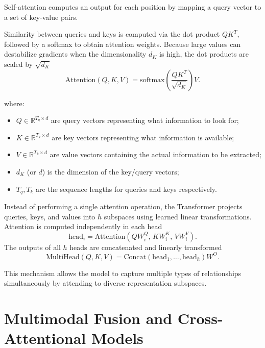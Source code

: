 Self-attention computes an output for each position by mapping a query vector to a set of key-value pairs.


Similarity between queries and keys is computed via the dot product $QK^{T}$, followed by a softmax to obtain attention weights. Because large values can destabilize gradients when the dimensionality $d_{K}$ is high, the dot products are scaled by $\sqrt{d_{K}}$
\begin{equation}
\label{eq:attention}
\mathrm{Attention}(Q, K, V)
= \mathrm{softmax}\left( \frac{QK^{T}}{\sqrt{d_{K}}} \right) V.
\end{equation}

where:
\begin{itemize}
    \item $Q \in \mathbb{R}^{T_q \times d}$ are query vectors representing what information to look for;
    \item $K \in \mathbb{R}^{T_k \times d}$ are key vectors representing what information is available;
    \item $V \in \mathbb{R}^{T_k \times d}$ are value vectors containing the actual information to be extracted;
    \item $d_K$ (or $d$) is the dimension of the key/query vectors;
    \item $T_q, T_k$ are the sequence lengths for queries and keys respectively.
\end{itemize}

Instead of performing a single attention operation, the Transformer projects queries, keys, and values into $h$ subspaces using learned linear transformations. Attention is computed independently in each head
\[
\text{head}_{i} = \mathrm{Attention}(QW_i^{Q},\, KW_i^{K},\, VW_i^{V}).
\]
The outputs of all $h$ heads are concatenated and linearly transformed
\[
\mathrm{MultiHead}(Q,K,V) = 
\mathrm{Concat}(\text{head}_1, \ldots, \text{head}_h) W^{O}.
\]

This mechanism allows the model to capture multiple types of relationships simultaneously by attending to diverse representation subspaces.


\section{Multimodal Fusion and Cross-Attentional Models}

